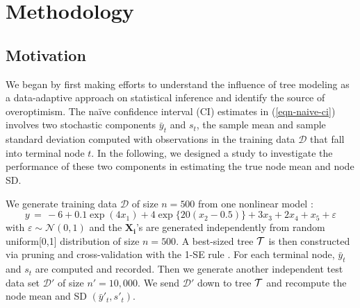 \chapter{Methodology}
\section{Motivation }

We began by first making efforts to understand the influence of tree modeling as a data-adaptive approach on statistical inference and identify the source of overoptimism. The na\"{i}ve confidence interval (CI) estimates in (\ref{eqn-naive-ci}) involves two stochastic components $\bar{y}_t$ and $s_t$, the sample mean and sample standard deviation computed with observations in the training data $\mathcal{D}$ that fall into terminal node $t.$ In the following, we designed a study to investigate the performance of these two components in estimating the true node mean and node SD.

We generate training data $\mathcal{D}$ of size $n=500$ from one nonlinear model \citep{friedman1991multivariate}:
\begin{equation}
\label{met}
y \, = \,  -6 + 0.1 \exp(4x_1) + 4 \exp\{20(x_2 - 0.5)\} + 3 x_3 + 2 x_4 + x_5 + \varepsilon
\end{equation}
with $\varepsilon \sim \mathcal{N}(0, 1)$ and the $\mathbf{X_i}$'s are generated independently from random uniform[0,1] distribution of size $n = 500$.  A best-sized tree $\mathcal{T}$ is then constructed via pruning and cross-validation with the 1-SE rule \citep{breiman1984classification}. For each terminal node, $\bar{y}_t$ and $s_t$ are computed and recorded. Then we generate another independent test data set $\mathcal{D}'$ of size $n'=10,000.$ We send $\mathcal{D}'$ down to tree $ \mathcal{T}$ and recompute the node mean and SD $(\bar{y}'_t, s'_t)$.

